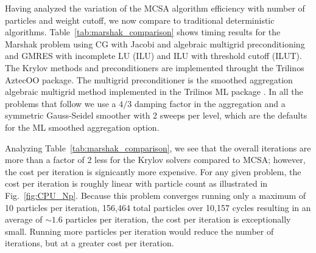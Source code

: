 \documentclass[preprint,12pt]{elsarticle}
\begin{document}
Having analyzed the variation of the MCSA algorithm efficiency with number of
particles and weight cutoff, we now compare to traditional deterministic
algorithms.  Table~\ref{tab:marshak_comparison} shows timing results for the
Marshak problem using CG with Jacobi and algebraic multigrid preconditioning
and GMRES with incomplete LU (ILU) and ILU with threshold cutoff (ILUT). The
Krylov methods and preconditioners are implemented throught the Trilinos
AztecOO package.  The multigrid preconditioner is the smoothed aggregation
algebraic multigrid method implemented in the Trilinos ML package
\cite{Gee:2007uj}.  In all the problems that follow we use a $4/3$ damping
factor in the aggregation and a symmetric Gauss-Seidel smoother with 2 sweeps
per level, which are the defaults for the ML smoothed aggregation option.

Analyzing Table~\ref{tab:marshak_comparison}, we see that the overall
iterations are more than a factor of 2 less for the Krylov solvers compared to
MCSA; however, the cost per iteration is signicantly more expensive.  For any
given problem, the cost per iteration is roughly linear with particle count as
illustrated in Fig.~\ref{fig:CPU_Np}.  Because this problem converges running
only a maximum of 10 particles per iteration, 156,464 total particles over
10,157 cycles resulting in an average of $\sim 1.6$ particles per iteration,
the cost per iteration is exceptionally small.  Running more particles per
iteration would reduce the number of iterations, but at a greater cost per
iteration.
\end{document}
